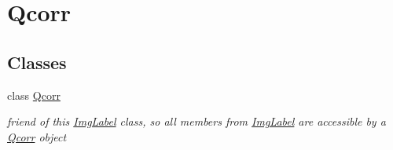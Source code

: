 \hypertarget{group__qcorr__mainwindow}{
\section{Qcorr}
\label{group__qcorr__mainwindow}
}
\subsection*{Classes}
\begin{DoxyCompactItemize}
\item 
class \hyperlink{classQcorr}{Qcorr}
\begin{DoxyCompactList}\small\item\em friend of this \hyperlink{classImgLabel}{ImgLabel} class, so all members from \hyperlink{classImgLabel}{ImgLabel} are accessible by a \hyperlink{classQcorr}{Qcorr} object \item\end{DoxyCompactList}\end{DoxyCompactItemize}
